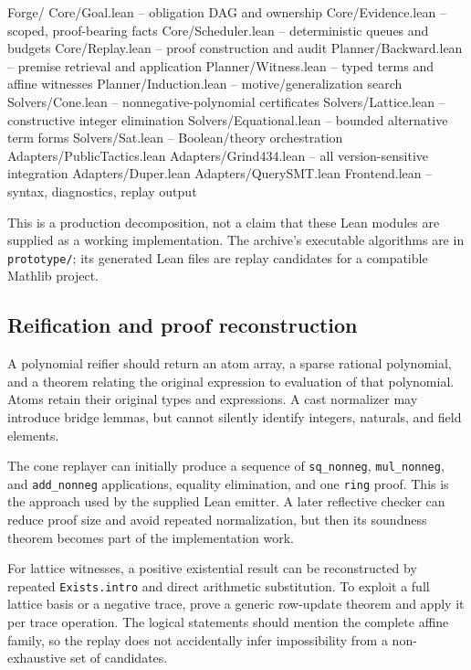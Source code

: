 \documentclass[11pt,a4paper]{article}
\newcommand{\codepath}[1]{\nolinkurl{#1}}
\begin{document}
\begin{code}
Forge/
  Core/Goal.lean             -- obligation DAG and ownership
  Core/Evidence.lean         -- scoped, proof-bearing facts
  Core/Scheduler.lean        -- deterministic queues and budgets
  Core/Replay.lean           -- proof construction and audit
  Planner/Backward.lean      -- premise retrieval and application
  Planner/Witness.lean       -- typed terms and affine witnesses
  Planner/Induction.lean     -- motive/generalization search
  Solvers/Cone.lean          -- nonnegative-polynomial certificates
  Solvers/Lattice.lean       -- constructive integer elimination
  Solvers/Equational.lean    -- bounded alternative term forms
  Solvers/Sat.lean           -- Boolean/theory orchestration
  Adapters/PublicTactics.lean
  Adapters/Grind434.lean     -- all version-sensitive integration
  Adapters/Duper.lean
  Adapters/QuerySMT.lean
  Frontend.lean              -- syntax, diagnostics, replay output
\end{code}

This is a production decomposition, not a claim that these Lean modules are supplied as a working implementation. The archive's executable algorithms are in \codepath{prototype/}; its generated Lean files are replay candidates for a compatible Mathlib project.

\subsection{Reification and proof reconstruction}

A polynomial reifier should return an atom array, a sparse rational polynomial, and a theorem relating the original expression to evaluation of that polynomial. Atoms retain their original types and expressions. A cast normalizer may introduce bridge lemmas, but cannot silently identify integers, naturals, and field elements.

The cone replayer can initially produce a sequence of \texttt{sq\_nonneg}, \texttt{mul\_nonneg}, and \texttt{add\_nonneg} applications, equality elimination, and one \texttt{ring} proof. This is the approach used by the supplied Lean emitter. A later reflective checker can reduce proof size and avoid repeated normalization, but then its soundness theorem becomes part of the implementation work.

For lattice witnesses, a positive existential result can be reconstructed by repeated \texttt{Exists.intro} and direct arithmetic substitution. To exploit a full lattice basis or a negative trace, prove a generic row-update theorem and apply it per trace operation. The logical statements should mention the complete affine family, so the replay does not accidentally infer impossibility from a non-exhaustive set of candidates.
\end{document}
